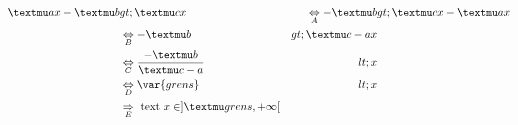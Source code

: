 \begin{align}
µ{a}x-µ{b}&gt;µ{c}x & \underset{A}\Leftrightarrow -µ{b}&gt;µ{c}x-µ{a}x\\
& \underset{B}\Leftrightarrow -µ{b}&gt;µ{c-a}x \\
& \underset{C}\Leftrightarrow \frac{-µ{b}}{µ{c-a}}&lt;x \\
& \underset{D}\Leftrightarrow \var{grens}&lt;x\\
  & \underset{E}\Rightarrow \text{ {text} } x \in ]µ{grens},+\infty[
\end{align}
